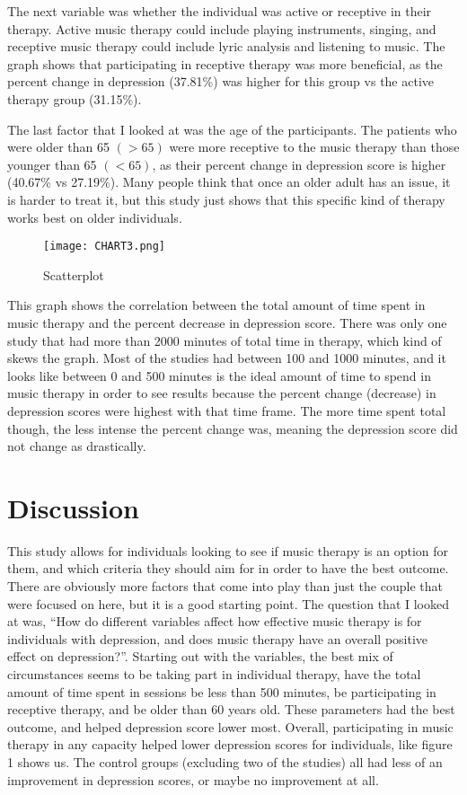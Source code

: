 \documentclass[12pt, titlepage]{article}
\begin{document}
 The next variable was whether the individual was active or receptive in their therapy. Active music therapy could include playing instruments, singing, and receptive music therapy could include lyric analysis and listening to music. The graph shows that participating in receptive therapy was more beneficial, as the percent change in depression (37.81\%) was higher  for this group vs the active therapy group (31.15\%). 
 
 The last factor that I looked at was the age of the participants. The patients who were older than 65 $(>65)$ were more receptive to the music therapy than those younger than 65 $(<65)$, as their percent change in depression score is higher (40.67\% vs 27.19\%). Many people think that once an older adult has an issue, it is harder to treat it, but this study just shows that this specific kind of therapy works best on older individuals.

 \newpage
 
 \begin{figure}[hbt!]
   \centering
   \texttt{[image: CHART3.png]}
   \label{fig:chart3}
   \caption{Scatterplot}
 \end{figure}

 This graph shows the correlation between the total amount of time spent in music therapy and the percent decrease in depression score. There was only one study that had more than 2000 minutes of total time in therapy, which kind of skews the graph. Most of the studies had between 100 and 1000 minutes, and it looks like between 0 and 500 minutes is the ideal amount of time to spend in music therapy in order to see results because the percent change (decrease) in depression scores were highest with that time frame. The more time spent total though, the less intense the percent change was, meaning the depression score did not change as drastically. 

 \section{Discussion} 
 \label{sec:discussion}

 This study allows for individuals looking to see if music therapy is an option for them, and which criteria they should aim for in order to have the best outcome. There are obviously more factors that come into play than just the couple that were focused on here, but it is a good starting point. The question that I looked at was, “How do different variables affect how effective music therapy is for individuals with depression, and does music therapy have an overall positive effect on depression?”. Starting out with the variables, the best mix of circumstances seems to be taking part in individual therapy, have the total amount of time spent in sessions be less than 500 minutes, be participating in receptive therapy, and be older than 60 years old. These parameters had the best outcome, and helped depression score lower most. Overall, participating in music therapy in any capacity helped lower depression scores for individuals, like figure 1 shows us. The control groups (excluding two of the studies) all had less of an improvement in depression scores, or maybe no improvement at all.
\end{document}
